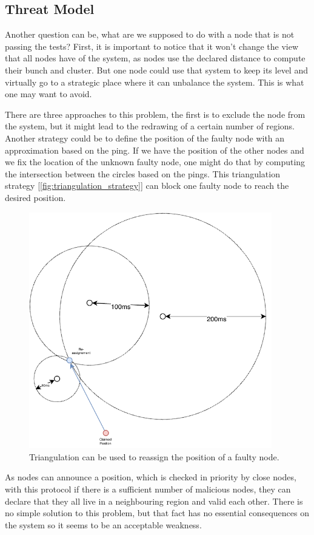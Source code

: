 \documentclass[a4paper,11pt,twoside,openright]{report}
\begin{document}
\subsection{Threat Model}
Another question can be, what are we supposed to do with a node that is not
passing the tests? First, it is important to notice that it won't change the
view that all nodes have of the system, as nodes use the declared distance
to compute their bunch and cluster. But one node could use that system to keep
its level and virtually go to a strategic place where it can unbalance the
system. This is what one may want to avoid. 

There are three approaches to this problem, the first is to exclude the node
from the system, but it might lead to the redrawing of a certain number of
regions. Another strategy could be to define the position of the faulty node
with an approximation based on the ping. If we have the position of the other
nodes and we fix the location of the unknown faulty node, one might do
that by computing the intersection between the circles based on the pings. This
triangulation strategy [\autoref{fig:triangulation_strategy}] can block one
faulty node to reach the desired position. 

\begin{figure}[!h] \centering
  \includegraphics[width=300pt]{figures/triangulation_strategy}
  \caption{Triangulation can be used to reassign the position of a faulty
  node. }
\label{fig:triangulation_strategy}
\end{figure}

As nodes can announce a position, which is checked in priority by close
nodes, with this protocol if there is a sufficient number of malicious nodes,
they can declare that they all live in a neighbouring region and valid each other.
There is no simple solution to this problem, but that fact has no essential consequences
on the system so it seems to be an acceptable weakness.
\end{document}
